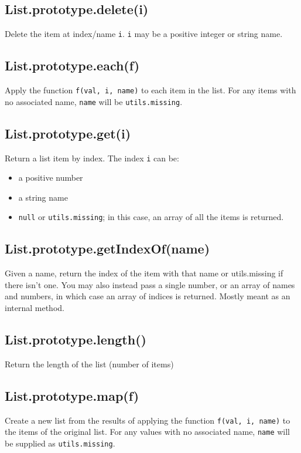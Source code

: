 \documentclass{article}
\begin{document}
    \subsection{List.prototype.delete(i)}
    Delete the item at index/name \texttt{i}. \texttt{i} may be a positive integer or string name.


    \subsection{List.prototype.each(f)}
    Apply the function \texttt{f(val, i, name)} to each item in the list.  For any
items with no associated name, \texttt{name} will be \texttt{utils.missing}.


    \subsection{List.prototype.get(i)}
    Return a list item by index. The index \texttt{i} can be:


\begin{itemize}

\item a positive number

\item a string name

\item \texttt{null} or \texttt{utils.missing}; in this case, an array of all the items
is returned.

\end{itemize}

    \subsection{List.prototype.getIndexOf(name)}
    Given a name, return the index of the item with that name
or utils.missing if there isn't one.
You may also instead pass a single number, or an array of names
and numbers, in which case an array of indices is returned.
Mostly meant as an internal method.


    \subsection{List.prototype.length()}
    Return the length of the list (number of items)


    \subsection{List.prototype.map(f)}
    Create a new list from the results of applying the function \texttt{f(val, i, name)}
to the items of the original list. For any values with no associated name,
\texttt{name} will be supplied as \texttt{utils.missing}.
\end{document}
